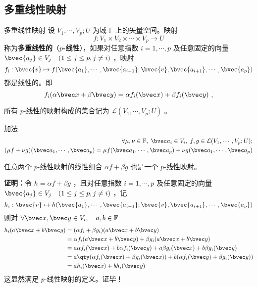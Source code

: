 \subsection{多重线性映射}
\begin{definition}{多重线性映射}
设 $V_1,\cdots,V_p;U$ 为域 $\mathbb{F}$ 上的矢量空间。映射
\begin{equation}
f:V_1\times V_2\times\cdots\times V_p\rightarrow U
\end{equation}
称为\textbf{多重线性的}（\textbf{$p$-线性}），如果对任意指数 $i=1,\cdots,p$ 及任意固定的向量 $\bvec{a_j}\in V_j\quad(1\leq j\leq p,j\neq i)$ ，映射
\begin{equation}
f_i:\bvec{v}\mapsto f(\bvec{a_1},\cdots,\bvec{a_{i-1}};\bvec{v},\bvec{a_{i+1}},\cdots,\bvec{a_p})
\end{equation}
都是线性的。即
\begin{equation}
f_i(\alpha\bvec x+\beta\bvec y)=\alpha f_i(\bvec x)+\beta f_i(\bvec y)~,
\end{equation}
\end{definition}
所有 $p$-线性的映射构成的集合记为 $\mathcal{L}(V_1,\cdots,V_p;U)$ 。
\begin{definition}{加法}
\begin{equation}
\begin{aligned}
\forall \mu,\nu\in\mathbb{F},\;\bvec a_i\in V_i,\;f,g\in \mathcal{L}(V_1,\cdots,V_p;U);\\
(\mu f+\nu g)(\bvec a_1,\cdots,\bvec a_p)=\mu f(\bvec a_1,\cdots,\bvec a_p)+\nu g(\bvec a_1,\cdots,\bvec a_p)
\end{aligned}
\end{equation}
\end{definition}
\begin{theorem}{}\label{MulMap_the1}
任意两个 $p$-线性映射的线性组合 $\alpha f+\beta g$ 也是一个 $p$-线性映射。
\end{theorem}
\textbf{证明：}令 $h=\alpha f+\beta g$ ，且对任意指数 $i=1,\cdots,p$ 及任意固定的向量 $\bvec{a_j}\in V_j\quad(1\leq j\leq p,j\neq i)$ ，记
\begin{equation}
h_i:\bvec{v}\mapsto h(\bvec{a_1},\cdots,\bvec{a_{i-1}};\bvec{v},\bvec{a_{i+1}},\cdots,\bvec{a_p})
\end{equation}
则对 $\forall \bvec x,\bvec y\in V_i,\quad a,b\in\mathbb{F}$
\begin{equation}
\begin{aligned}
h_i(a \bvec x+b\bvec y)&=(\alpha f_i+\beta g_i)(a \bvec x+b\bvec y)\\
&=\alpha f_i(a \bvec x+b\bvec y)+\beta g_i(a \bvec x+b\bvec y)\\
&=a\alpha f_i(\bvec x)+b\alpha f_i(\bvec y)+a\beta g_i(\bvec x)+b\beta g_i(\bvec y)\\
&=a\qty(\alpha f_i(\bvec x)+\beta g_i(\bvec x))+b(\alpha f_i(\bvec y)+\beta g_i(\bvec y))\\
&=ah_i(\bvec x)+bh_i(\bvec y)
\end{aligned}
\end{equation}
这显然满足 $p$-线性映射的定义。证毕！


